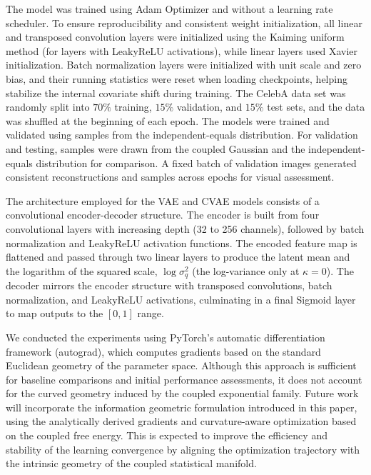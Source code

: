 \documentclass[twoside,11pt]{article}
\begin{document}
The model was trained using Adam Optimizer and without a learning rate scheduler. To ensure reproducibility and consistent weight initialization, all linear and transposed convolution layers were initialized using the Kaiming uniform method (for layers with LeakyReLU activations), while linear layers used Xavier initialization. Batch normalization layers were initialized with unit scale and zero bias, and their running statistics were reset when loading checkpoints, helping stabilize the internal covariate shift during training. The CelebA data set was randomly split into $70\%$ training, $15\% $ validation, and $15\%$ test sets, and the data was shuffled at the beginning of each epoch. The models were trained and validated using samples from the independent-equals distribution. For validation and testing, samples were drawn from the coupled Gaussian and the independent-equals distribution for comparison. A fixed batch of validation images generated consistent reconstructions and samples across epochs for visual assessment.

The architecture employed for the VAE and CVAE models consists of a convolutional encoder-decoder structure. The encoder is built from four convolutional layers with increasing depth (32 to 256 channels), followed by batch normalization and LeakyReLU activation functions. The encoded feature map is flattened and passed through two linear layers to produce the latent mean and the logarithm of the squared scale, $\log\sigma_q^2$ (the log-variance only at $\kappa=0$). The decoder mirrors the encoder structure with transposed convolutions, batch normalization, and LeakyReLU activations, culminating in a final Sigmoid layer to map outputs to the $[0, 1]$ range. 

We conducted the experiments using PyTorch's automatic differentiation framework (autograd), which computes gradients based on the standard Euclidean geometry of the parameter space. Although this approach is sufficient for baseline comparisons and initial performance assessments, it does not account for the curved geometry induced by the coupled exponential family. Future work will incorporate the information geometric formulation introduced in this paper, using the analytically derived gradients and curvature-aware optimization based on the coupled free energy. This is expected to improve the efficiency and stability of the learning convergence by aligning the optimization trajectory with the intrinsic geometry of the coupled statistical manifold.
\end{document}
